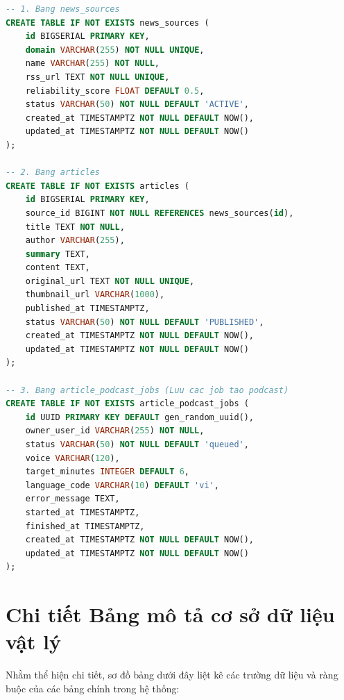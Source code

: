 \documentclass[12pt,a4paper]{report}
\begin{document}
\begin{lstlisting}[language=SQL]
-- 1. Bang news_sources
CREATE TABLE IF NOT EXISTS news_sources (
    id BIGSERIAL PRIMARY KEY,
    domain VARCHAR(255) NOT NULL UNIQUE,
    name VARCHAR(255) NOT NULL,
    rss_url TEXT NOT NULL UNIQUE,
    reliability_score FLOAT DEFAULT 0.5,
    status VARCHAR(50) NOT NULL DEFAULT 'ACTIVE',
    created_at TIMESTAMPTZ NOT NULL DEFAULT NOW(),
    updated_at TIMESTAMPTZ NOT NULL DEFAULT NOW()
);

-- 2. Bang articles
CREATE TABLE IF NOT EXISTS articles (
    id BIGSERIAL PRIMARY KEY,
    source_id BIGINT NOT NULL REFERENCES news_sources(id),
    title TEXT NOT NULL,
    author VARCHAR(255),
    summary TEXT,
    content TEXT,
    original_url TEXT NOT NULL UNIQUE,
    thumbnail_url VARCHAR(1000),
    published_at TIMESTAMPTZ,
    status VARCHAR(50) NOT NULL DEFAULT 'PUBLISHED',
    created_at TIMESTAMPTZ NOT NULL DEFAULT NOW(),
    updated_at TIMESTAMPTZ NOT NULL DEFAULT NOW()
);

-- 3. Bang article_podcast_jobs (Luu cac job tao podcast)
CREATE TABLE IF NOT EXISTS article_podcast_jobs (
    id UUID PRIMARY KEY DEFAULT gen_random_uuid(),
    owner_user_id VARCHAR(255) NOT NULL,
    status VARCHAR(50) NOT NULL DEFAULT 'queued',
    voice VARCHAR(120),
    target_minutes INTEGER DEFAULT 6,
    language_code VARCHAR(10) DEFAULT 'vi',
    error_message TEXT,
    started_at TIMESTAMPTZ,
    finished_at TIMESTAMPTZ,
    created_at TIMESTAMPTZ NOT NULL DEFAULT NOW(),
    updated_at TIMESTAMPTZ NOT NULL DEFAULT NOW()
);
\end{lstlisting}

\section{Chi tiết Bảng mô tả cơ sở dữ liệu vật lý}

Nhằm thể hiện chi tiết, sơ đồ bảng dưới đây liệt kê các trường dữ liệu và ràng buộc của các bảng chính trong hệ thống:
\end{document}
